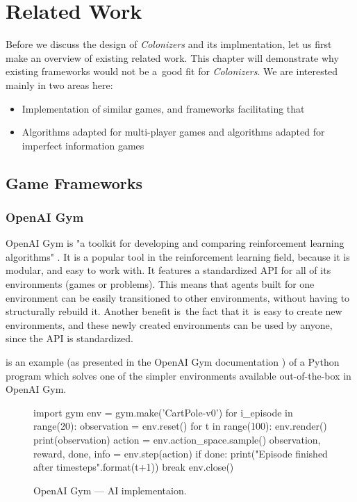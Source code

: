 \chapter{Related Work}

Before we discuss the design of \emph{Colonizers} and its implmentation,
let us first make an overview of existing related work. This chapter will
demonstrate why existing frameworks would not be a~good fit for \emph{Colonizers}.
We are interested mainly in two areas here:
\begin{itemize}
    \item Implementation of similar games, and frameworks facilitating that
    \item Algorithms adapted for multi-player games and algorithms adapted
        for imperfect information games
\end{itemize}

\section{Game Frameworks}

\subsection{OpenAI Gym}

OpenAI Gym is "a toolkit for developing and comparing reinforcement learning algorithms"
\cite{Openaigym}. It is a popular tool in the reinforcement learning field,
because it is modular, and easy to work with. It features a standardized API for
all of its environments (games or problems). This means that agents built for one
environment can be easily transitioned to other environments, without having to
structurally rebuild it. Another benefit is~the fact that it~is easy to create
new environments, and these newly created environments can be used by anyone,
since the API is standardized.

 is an example (as presented in the OpenAI Gym documentation
\cite{Openaigym}) of a Python program which solves one of the simpler environments
available out-of-the-box in OpenAI Gym.

\begin{figure}[h!]
\begin{code}
import gym
env = gym.make('CartPole-v0')
for i_episode in range(20):
    observation = env.reset()
    for t in range(100):
        env.render()
        print(observation)
        action = env.action_space.sample()
        observation, reward, done, info = env.step(action)
        if done:
            print("Episode finished after {} timesteps".format(t+1))
            break
env.close()
\end{code}
\caption{OpenAI Gym --- AI implementaion.}\label{figrw:gym}
\end{figure}

